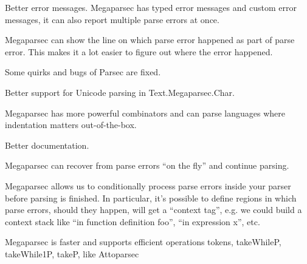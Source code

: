   Better error messages. Megaparsec has typed error messages and custom error messages, it can also report multiple parse errors at once.
  
  Megaparsec can show the line on which parse error happened as part of parse error. This makes it a lot easier to figure out where the error happened.
  
  Some quirks and bugs of Parsec are fixed.
  
  Better support for Unicode parsing in Text.Megaparsec.Char.
  
  Megaparsec has more powerful combinators and can parse languages where indentation matters out-of-the-box.
  
  Better documentation.
  
  Megaparsec can recover from parse errors “on the fly” and continue parsing.
  
  Megaparsec allows us to conditionally process parse errors inside your parser before parsing is finished. In particular, it's possible to define regions in which parse errors, should they happen, will get a “context tag”, e.g. we could build a context stack like “in function definition foo”, “in expression x”, etc.
  
  Megaparsec is faster and supports efficient operations tokens, takeWhileP, takeWhile1P, takeP, like Attoparsec
\fi

\iffalse

\subsection{Monada Empleada}
type Parser = ...

\subsection{Decisiones Importantes}
- Paréntesis en Tipos Definidos
- Paréntesis en expresiones contra variables

\fi

